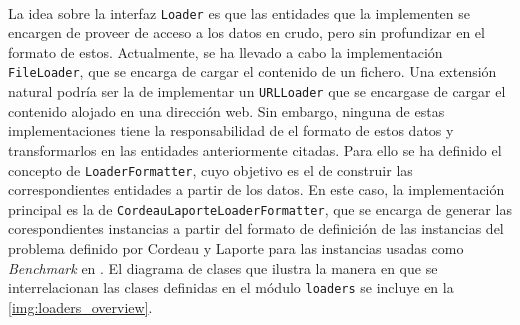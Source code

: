 \documentclass{subfiles}
\begin{document}
          \paragraph{}
          La idea sobre la interfaz \texttt{Loader} es que las entidades que la implementen se encargen de proveer de acceso a los datos en crudo, pero sin profundizar en el formato de estos. Actualmente, se ha llevado a cabo la implementación \texttt{FileLoader}, que se encarga de cargar el contenido de un fichero. Una extensión natural podría ser la de implementar un \texttt{URLLoader} que se encargase de cargar el contenido alojado en una dirección web. Sin embargo, ninguna de estas implementaciones tiene la responsabilidad de  el formato de estos datos y transformarlos en las entidades anteriormente citadas. Para ello se ha definido el concepto de \texttt{LoaderFormatter}, cuyo objetivo es el de construir las correspondientes entidades a partir de los datos. En este caso, la implementación principal es la de \texttt{CordeauLaporteLoaderFormatter}, que se encarga de generar las corespondientes instancias a partir del formato de definición de las instancias del problema definido por Cordeau y Laporte para las instancias usadas como \emph{Benchmark} en \cite{cordeau2003tabu}. El diagrama de clases que ilustra la manera en que se interrelacionan las clases definidas en el módulo \texttt{loaders} se incluye en la \cref{img:loaders_overview}.
\end{document}
